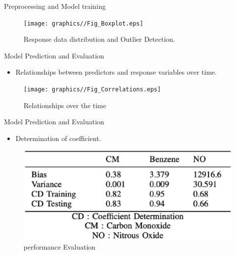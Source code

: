 \documentclass[
 size=14pt,
 paper=smartboard,  %
 mode=present, 		%
 display=slides, 	%
 style=tuliplab,  	%
 pauseslide,
 fleqn,leqno]{powerdot}
\begin{document}
\begin{slide}[toc=,bm=]{Preprocessing and Model training}
  
  {
 


  }
  {
    \begin{figure}
      \texttt{[image: graphics//Fig\_Boxplot.eps]}
      \caption{Response data distribution and Outlier Detection.} \label{Bias}
   \end{figure}
  }
  

  
  \end{slide}

\begin{slide}{ Model Prediction and Evaluation}
  \begin{itemize}
  \item
  Relationships between predictors and response variables over time.
  
  \end{itemize}
  
  
  \begin{figure}
    \texttt{[image: graphics//Fig\_Correlations.eps]}
    \caption{Relationships over the time} \label{Bias}
  \end{figure}
  \end{slide}
\begin{slide}{ Model Prediction and Evaluation}
\begin{itemize}
\item
Determination of coefficient.

\end{itemize}


\begin{figure}
  \includegraphics[width=0.9\linewidth,height=0.5\linewidth]{graphics//Evaluation.eps}
  \caption{performance Evaluation} \label{Bias}
\end{figure}
\end{slide}
\end{document}
